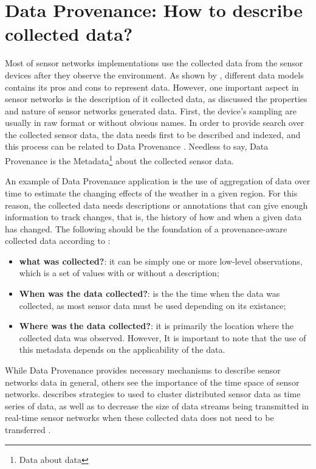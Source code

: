 \section{Data Provenance: How to describe collected data?}
\label{sec:sn-provenance}

Most of sensor networks implementations use the collected data from the sensor
devices after they observe the environment. As shown by
\cite{sn-data-model-survey}, different data models contains its pros and
cons to represent data. However, one important aspect in sensor networks is the
description of it collected data, as \cite{sn-provenance} discussed the
properties and nature of sensor networks generated data. First, the device's
sampling are usually in raw format or without obvious names. In order to
provide search over the collected sensor data, the data needs first to be
described and indexed, and this process can be related to Data Provenance
\cite{db-provenance}. Needless to say, Data Provenance is the 
Metadata\footnote{Data about data} about the collected sensor data.

An example of Data Provenance application is the use of aggregation of data
over time to estimate the changing effects of the weather in a given region.
For this reason, the collected data needs descriptions or annotations that can
give enough information to track changes, that is, the history of how and when
a given data has changed. The following should be the foundation of a
provenance-aware collected data according to \cite{sn-provenance}:

\begin{itemize}
  \item \textbf{what was collected?}: it can be simply one or more low-level
  observations, which is a set of values with or without a description;
  \item \textbf{When was the data collected?}: is the the time when the data was
  collected, as most sensor data must be used depending on its existance;
  \item \textbf{Where was the data collected?}: it is primarily the location
  where the collected data was observed. However, It is important to note that
  the use of this metadata depends on the applicability of the data.
\end{itemize}

While Data Provenance provides necessary mechanisms to describe sensor networks
data in general, others see the importance of the time space of sensor
networks. \cite{sn-time-series} describes strategies to used to cluster
distributed sensor data as time series of data, as well as to decrease the size
of data streams being transmitted in real-time sensor networks when these
collected data does not need to be transferred \cite{sn-data-reduction}.

